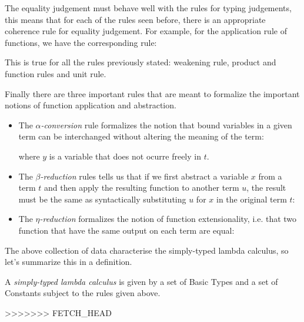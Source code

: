 The equality judgement must behave well with the rules for typing judgements, this means that for each of the rules seen before, there is an appropriate coherence rule for equality judgement. For example, for the application rule of functions, we have the corresponding rule:
\begin{prooftree}
\end{prooftree}
This is true for all the rules previously stated: weakening rule, product and function rules and unit rule.

Finally there are three important rules that are meant to formalize the important notions of function application and abstraction.
\begin{itemize}
\item The \emph{$\alpha$-conversion} rule formalizes the notion that bound variables in a given term can be interchanged without altering the meaning of the term:
\begin{prooftree}
\end{prooftree}
where $y$ is a variable that does not ocurre freely in $t$.

\item The \emph{$\beta$-reduction} rules tells us that if we first abstract a variable $x$ from a term $t$ and then apply the resulting function to another term $u$, the result must be the same as syntactically substituting $u$ for $x$ in the original term $t$:
\begin{prooftree}
\end{prooftree}

\item The \emph{$\eta$-reduction} formalizes the notion of function extensionality, i.e. that two function that have the same output on each term are equal:

\begin{prooftree}
\end{prooftree}
\end{itemize}

The above collection of data characterise the simply-typed lambda calculus, so let's summarize this in a definition.
\begin{defn}
A \emph{simply-typed lambda calculus} is given by a set of Basic Types and a set of Constants subject to the rules given above. 
\end{defn}
>>>>>>> FETCH_HEAD

\nocite{*}




